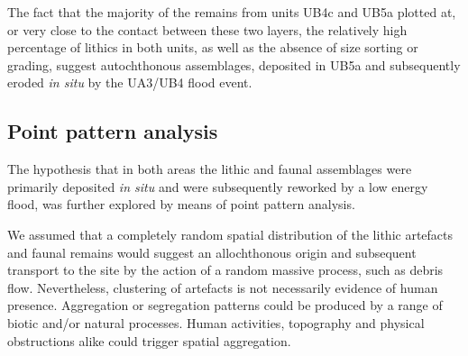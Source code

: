 \documentclass[preprint,authoryear,times]{elsarticle} %
\begin{document}
The fact that the majority of the remains from units UB4c and UB5a plotted at, or very close to the contact between these two layers, the relatively high percentage of lithics in both units, as well as the absence of size sorting or grading, suggest autochthonous assemblages, deposited in UB5a and subsequently eroded \emph{in situ} by the UA3/UB4 flood event.


\subsection{Point pattern analysis}




The hypothesis that in both areas the lithic and faunal assemblages were primarily deposited \emph{in situ} and were subsequently reworked by a low energy flood, was further explored by means of point pattern analysis.

We assumed that a completely random spatial distribution of the lithic artefacts and faunal remains would suggest an allochthonous origin and subsequent transport to the site by the action of a random massive process, such as debris flow. Nevertheless, clustering of artefacts is not necessarily evidence of human presence. Aggregation or segregation patterns could be produced by a range of biotic and/or natural processes. Human activities, topography and physical obstructions alike could trigger spatial aggregation.
\end{document}
